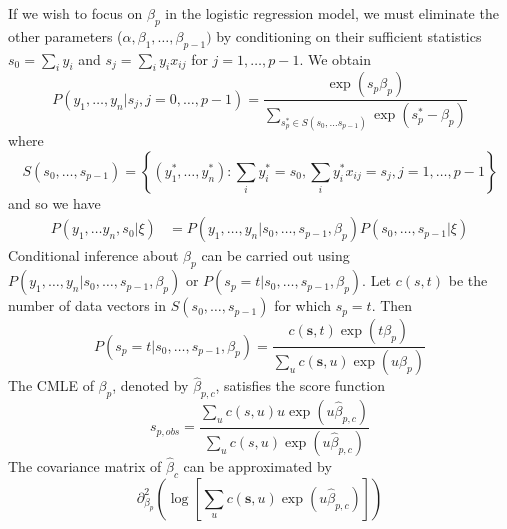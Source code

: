 \documentclass[12pt]{article}
\newcommand{\bhat}{\hat{\beta}}
\numberwithin{equation}{section}
\begin{document}
If we wish to focus on $\beta_p$ in the logistic regression model, we must eliminate the other parameters ($\alpha, \beta_1, \ldots, \beta_{p-1})$ by conditioning on their sufficient statistics 
$s_0 = \sum_i y_i$ and $s_j = \sum_i y_i x_{ij}$ for $j = 1, \ldots, p-1$. We obtain
%
\begin{equation*}
  P(y_1, \ldots, y_n | s_j, j = 0, \ldots, p-1) =
    \frac{\exp(s_p \beta_p)}{\sum_{s^*_p \in S(s_0, \ldots s_{p-1})} \exp(s_p^* - \beta_p)}
\end{equation*}
%
where 
\begin{equation*}
  S(s_0, \ldots, s_{p-1}) = 
    \left\{
    (y_1^*, \ldots, y_n^*) : \sum_i y_i^* = s_0, 
      \sum_i y_i^* x_{ij} = s_j, j = 1, \ldots, p-1
    \right\}
\end{equation*}
%
and so we have
\begin{align*}
  P(y_1, \ldots y_n, s_0 | \xi) &= P(y_1, \ldots, y_n | s_0, \ldots, s_{p-1}, \beta_p) P(s_0, \ldots, s_{p-1} | \xi)
\end{align*}
%
Conditional inference about $\beta_p$ can be carried out using $P(y_1, \ldots, y_n | s_0, \ldots, s_{p-1}, \beta_p)$ or
$P(s_p = t | s_0, \ldots, s_{p-1}, \beta_p)$. Let $c(s, t)$ be the number of data vectors in $S(s_0, \ldots, s_{p-1})$ for which $s_p = t$. Then
%
\begin{equation*}
  P(s_p = t | s_0, \ldots, s_{p-1}, \beta_p) =
    \frac{c(\mathbf{s}, t) \exp(t \beta_p)}{\sum_u c(\mathbf{s}, u) \exp(u \beta_p)}
\end{equation*}
%
The CMLE of $\beta_p$, denoted by $\bhat_{p, c}$, satisfies the score function
\begin{equation*}
  s_{p, obs} = \frac{\sum_u c(s, u) u \exp(u \bhat_{p, c})}{
  \sum_u c(s, u) \exp(u \bhat_{p, c})}
\end{equation*}
%
The covariance matrix of $\bhat_{c}$ can be approximated by
\begin{equation*}
  \partial^2_{\beta_p} 
  \left( \log
  \left[
    \sum_u c(\mathbf{s}, u) \exp(u \bhat_{p, c})
  \right]
  \right)
\end{equation*}
%
%
\end{document}
